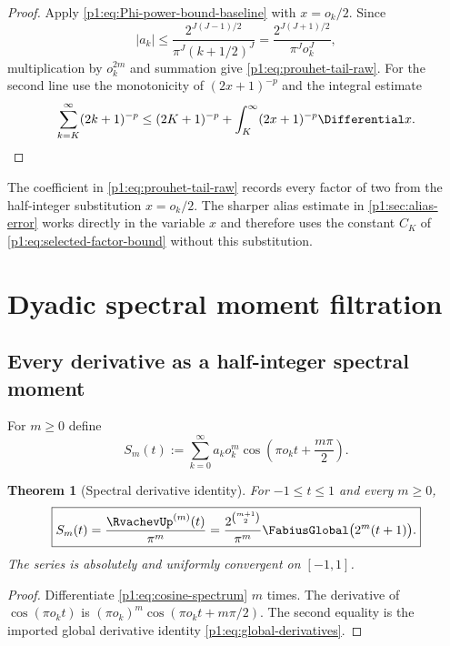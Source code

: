 \documentclass[11pt,oneside]{article}
\newtheorem{theorem}{Theorem}[section]
\theoremstyle{definition}
\theoremstyle{remark}
\begin{document}
\begin{proof}
Apply \eqref{p1:eq:Phi-power-bound-baseline} with $x=o_k/2$.  Since
\[
 |a_k|\le
 \frac{2^{J(J-1)/2}}{\pi^J(k+1/2)^J}
 =\frac{2^{J(J+1)/2}}{\pi^Jo_k^J},
\]
multiplication by $o_k^{2m}$ and summation give
\eqref{p1:eq:prouhet-tail-raw}.  For the second line use the monotonicity of
$(2x+1)^{-p}$ and the integral estimate
\[
 \sum_{k=K}^{\infty}(2k+1)^{-p}
 \le (2K+1)^{-p}+\int_K^\infty(2x+1)^{-p}\Differential x.
\]
\end{proof}

\begin{remark}
The coefficient in \eqref{p1:eq:prouhet-tail-raw} records every factor of two from
the half-integer substitution $x=o_k/2$.  The sharper alias estimate in
\cref{p1:sec:alias-error} works directly in the variable $x$ and therefore uses the
constant $C_K$ of \eqref{p1:eq:selected-factor-bound} without this substitution.
\end{remark}

\section{Dyadic spectral moment filtration}\label{p1:sec:moment-filtration}

\subsection{Every derivative as a half-integer spectral moment}

For $m\ge0$ define
\begin{equation}\label{p1:eq:S-m-def}
 S_m(t):=\sum_{k=0}^{\infty}a_ko_k^m
 \cos\!\left(\pi o_kt+\frac{m\pi}{2}\right).
\end{equation}

\begin{theorem}[Spectral derivative identity]\label{p1:thm:spectral-derivative}
For $-1\le t\le1$ and every $m\ge0$,
\begin{equation}\label{p1:eq:spectral-derivative}
 \boxed{
 S_m(t)=\frac{\RvachevUp^{(m)}(t)}{\pi^m}
 =\frac{2^{\binom{m+1}{2}}}{\pi^m}
 \FabiusGlobal\bigl(2^m(t+1)\bigr).}
\end{equation}
The series is absolutely and uniformly convergent on $[-1,1]$.
\end{theorem}

\begin{proof}
Differentiate \eqref{p1:eq:cosine-spectrum} $m$ times.  The derivative of
$\cos(\pi o_kt)$ is
$(\pi o_k)^m\cos(\pi o_kt+m\pi/2)$.  The second equality is the imported
global derivative identity \eqref{p1:eq:global-derivatives}.
\end{proof}
\end{document}
